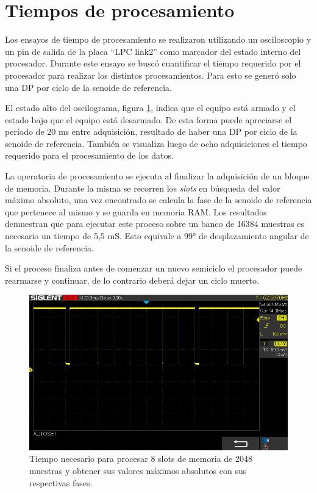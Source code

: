 \vspace{5mm}

\section{Tiempos de procesamiento}
Los ensayos de tiempo de procesamiento se realizaron utilizando un osciloscopio y un pin de salida de la placa \enquote{LPC link2} como marcador del estado interno del procesador. Durante este ensayo se buscó cuantificar el tiempo requerido por el procesador para realizar los distintos procesamientos. Para esto se generó solo una DP por ciclo de la senoide de referencia. 

El estado alto del oscilograma, figura \ref{fig:tiempoSavePatron}, indica que el equipo está armado y el estado bajo que el equipo está desarmado. De esta forma puede apreciarse el período de 20 ms entre adquisición, resultado de haber una DP por ciclo de la senoide de referencia. También se visualiza luego de ocho adquisiciones el tiempo requerido para el procesamiento de los datos. 

La operatoria de procesamiento se ejecuta al finalizar la adquisición de un bloque de memoria. Durante la misma se recorren los \textit{slots} en búsqueda del valor máximo absoluto, una vez encontrado se calcula la fase de la senoide de referencia que pertenece al mismo y se guarda en memoria RAM. Los resultados demuestran que para ejecutar este proceso sobre un banco de 16384 muestras es necesario un tiempo de 5,5 mS. Esto equivale a 99° de desplazamiento angular de la senoide de referencia. 

Si el proceso finaliza antes de comenzar un nuevo semiciclo el procesador puede rearmarse y continuar, de lo contrario deberá dejar un ciclo muerto.

\newpage


\begin{figure}[ht]
	\centering
	\includegraphics[width=133mm]{./Figures/tiempoSavePatron.png}
	\caption{Tiempo necesario para procesar 8 slots de memoria de 2048 muestras y obtener sus valores máximos absolutos con sus respectivas fases.}
	\label{fig:tiempoSavePatron}
\end{figure}

